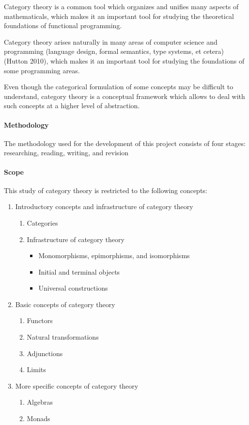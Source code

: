 Category theory is a common tool which organizes and unifies many
aspects of mathematicals, which makes it an important tool for
studying the theoretical foundations of functional programming.

Category theory arises naturally in many areas of computer science and
programming (language design, formal semantics, type systems, et
cetera) (Hutton 2010), which makes it an important tool for studying
the foundations of some programming areas.

Even though the categorical formulation of some concepts may be
difficult to understand, category theory is a conceptual framework
which allows to deal with such concepts at a higher level of
abstraction.

\paragraph{Methodology}

The methodology used for the development of this project consists of
four stages: researching, reading, writing, and revision

\paragraph{Scope}

This study of category theory is restricted to the following concepts:

\begin{enumerate}
\item Introductory concepts and infrastructure of category theory
  \begin{enumerate}
  \item Categories
  \item Infrastructure of category theory
    \begin{itemize}
    \item Monomorphisms, epimorphisms, and isomorphisms
    \item Initial and terminal objects
    \item Universal constructions
    \end{itemize}
  \end{enumerate}
\item Basic concepts of category theory
  \begin{enumerate}
  \item Functors
  \item Natural transformations
  \item Adjunctions
  \item Limits
  \end{enumerate}
\item More specific concepts of category theory
  \begin{enumerate}
  \item Algebras
  \item Monads
  \end{enumerate}
\end{enumerate}

